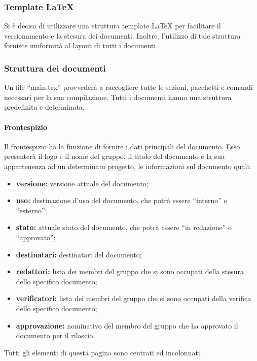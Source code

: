 		\subsubsection{Template LaTeX}
			Si è deciso di utilizzare una struttura template \LaTeX{} per facilitare il versionamento e la stesura dei documenti. Inoltre, l'utilizzo di tale struttura fornisce uniformità al layout di tutti i documenti.
		\subsubsection{Struttura dei documenti}
			Un file ``main.tex'' provvederà a raccogliere tutte le sezioni, pacchetti e comandi necessari per la sua compilazione. Tutti i documenti hanno una struttura predefinita e determinata.
			\paragraph{Frontespizio}
				Il frontespizio ha la funzione di fornire i dati principali del documento. Esso presenterà il logo e il nome del gruppo, il titolo del documento e la sua appartenenza ad un determinato progetto, le informazioni sul documento quali:
				\begin{itemize}
					\item \textbf{versione:} versione attuale del documento;
					\item \textbf{uso:} destinazione d'uso del documento, che potrà essere ``interno'' o ``esterno'';
					\item \textbf{stato:} attuale stato del documento, che potrà essere ``in redazione'' o ``approvato'';
					\item \textbf{destinatari:} destinatari del documento;
					\item \textbf{redattori:} lista dei membri del gruppo che si sono occupati della stesura dello specifico documento;
					\item \textbf{verificatori:} lista dei membri del gruppo che si sono occupati della verifica dello specifico documento;
					\item \textbf{approvazione:} nominativo del membro del gruppo che ha approvato il documento per il rilascio.
				\end{itemize}
				Tutti gli elementi di questa pagina sono centrati ed incolonnati.
